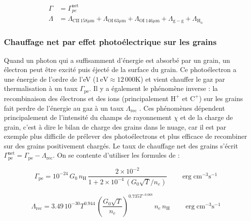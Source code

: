 \begin{equation}
    \begin{split}
        \Gamma &= \Gamma_{pe}^{\mathrm{net}} \\
        \Lambda &=   \Lambda_{\mathrm{CII}\ 158 \mu \mathrm{m}} + \Lambda_{\mathrm{OI}\ 63 \mu \mathrm{m}} + \Lambda_{\mathrm{OI}\ 146 \mu \mathrm{m}}  + \Lambda_{\mathrm{g}-\mathrm{g}} + \Lambda_{\mathrm{H}_\alpha}
    \end{split}
\end{equation}


\subsubsection{Chauffage net par effet photoélectrique sur les grains}

Quand un photon qui a suffisamment d'énergie est absorbé par un grain, un électron peut être excité puis éjecté de la surface du grain. Ce photoélectron a une énergie de l'ordre de l'eV ($1\,\mathrm{eV}\approx 12\,000$K) et vient chauffer le gaz par thermalisation à un taux $\Gamma_{\mathrm{pe}}$. Il y a également le phénomène inverse : la recombinaison des électrons et des ions (principalement $\mathrm{H}^+$ et $\mathrm{C}^+$) sur les grains fait perdre de l'énergie au gaz à un taux $\Lambda_{\mathrm{rec}}$ \cite{Lequeux}. Ces phénomènes dépendent principalement de l'intensité du champs de rayonnement $\chi$ et de la charge de grain, c'est à dire le bilan de charge des grains dans le nuage, car il est par exemple plus difficile de prélever des photoélectrons et plus efficace de recombiner sur des grains positivement chargés. Le taux de chauffage net des grains s'écrit $\Gamma^{\mathrm{net}}_{\mathrm{pe}} = \Gamma_{\mathrm{pe}} - \Lambda_{\mathrm{rec}}$. On se contente d'utiliser les formules de \cite{BakesTielens1994} :

\begin{equation}
    \Gamma_{\mathrm{pe}} = 10^{-24}\,G_0\,n_\mathrm{H}\, \frac{2\times 10^{-2}}{1 + 2\times 10^{-4}\,(G_0 \sqrt{T}/n_e)} \qquad \operatorname{erg} \mathrm{cm}^{-3} \mathrm{s}^{-1}
    \label{eq:Rollig:pe}
\end{equation}

\begin{equation}
    \Lambda_{\mathrm{rec}} = 3.49\,10^{-30} T^{0.944} \, (\frac{G_0 \sqrt{T}}{n_e})^{0.735 T^{-0.068}} \, n_e \, n_\mathrm{H} \qquad \operatorname{erg} \mathrm{cm}^{-3} \mathrm{s}^{-1}
    \label{eq:Rollig:rece}
\end{equation}

